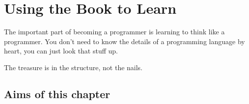 \documentclass[krantz2]{krantz}\usepackage{knitr}
\begin{document}
%
%
%
%

\mainmatter


\chapter{Using the Book to Learn \Rlang}

\begin{VF}
The important part of becoming a programmer is learning to think like a programmer. You don't need to know the details of a programming language by heart, you can just look that stuff up.\vspace{1.5ex}

The treasure is in the structure, not the nails.

\nocite{Burns2012}
\end{VF}

\section{Aims of this chapter}
\end{document}
